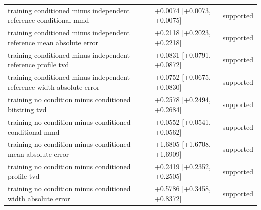 \begin{table}[p]
\begin{tabular}{@{}p{}p{}p{}@{}}
training conditioned minus independent reference conditional mmd & +0.0074 [+0.0073, +0.0075] & supported \\
training conditioned minus independent reference mean absolute error & +0.2118 [+0.2023, +0.2218] & supported \\
training conditioned minus independent reference profile tvd & +0.0831 [+0.0791, +0.0872] & supported \\
training conditioned minus independent reference width absolute error & +0.0752 [+0.0675, +0.0830] & supported \\
training no condition minus conditioned bitstring tvd & +0.2578 [+0.2494, +0.2684] & supported \\
training no condition minus conditioned conditional mmd & +0.0552 [+0.0541, +0.0562] & supported \\
training no condition minus conditioned mean absolute error & +1.6805 [+1.6708, +1.6909] & supported \\
training no condition minus conditioned profile tvd & +0.2419 [+0.2352, +0.2505] & supported \\
training no condition minus conditioned width absolute error & +0.5786 [+0.3458, +0.8372] & supported \\
\bottomrule
\end{tabular}
\end{table}
\clearpage
